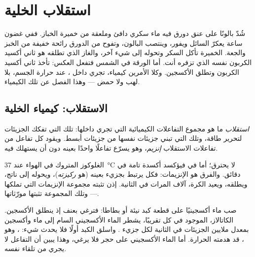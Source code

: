 \chapter{استقلاب الخلية}\label{ch:g10:cell-metabolism}

شُدّ بالونًا على عنق دورق فيه ماء سكري دافئ وملعقة من خميرة الخباز.
ففي غضون ساعة يعكرّ السائل ويفور، وينتصب البالون، وتفوح من الدورق
رائحة خفيفة من الخبز والجعة.  الخميرة تأكل السكر وتحوله إلى شيء
آخر، والغاز الذي تطلقه هو ثاني أكسيد الكربون نفسه الذي تزفره أنت. أما
الورقة في الشمس فتفعل العكس: تأخذ ثاني أكسيد الكربون وتطلق الأكسجين.
وكلا الأمرين كيمياء، تجري داخل ، عند حرارة الجسم، بلا لهب ولا
حمض --- وهذا الفصل عن تلك الكيمياء.

\section{الاستقلاب: كيمياء الخلية}

\begin{definition}[الاستقلاب]\label{def:g10:cell-metabolism:metabolism}
\emph{استقلاب}  ما هو مجموع التفاعلات الكيميائية
التي تجري داخلها: تلك التي تفكك الجزيئات لتحرير طاقة، وتلك التي تبني
جزيئات  نفسها من جزيئات أبسط. ويقود كل تفاعل من تفاعلات
الاستقلاب \emph{إنزيم}، وهو  يسرّع تفاعلًا واحدًا
بعينه دون أن يستهلك فيه.
\end{definition}

\begin{proposition}\label{prop:g10:cell-metabolism:enzymes}
الغلوكوز المتروك في الهواء عند \qty{37}{\celsius} لا يحترق؛ أما في
 فيؤكسد أكسدة تامة في دقائق. والفرق هو الإنزيمات: فكل 
يرتبط بجزيء بعينه (هو \emph{ركيزته})، ويحوله إلى ناتج، ويطلقه، ويعيد
الكرة، آلاف المرات في الثانية.   إذن تثبته مجموعة
الإنزيمات التي تملكها --- وتلك المجموعة تثبتها مورّثاتها.
\end{proposition}
\admitted

\begin{example}\label{ex:g10:cell-metabolism:catalase}
صب ماء أكسجينيًا على قطعة كبد نيئة أو بطاطا: فترغي بعنف إذ ينطلق
الأكسجين.  الكاتالاز، الموجود في كل  تقريبًا، يشطر الماء
الأكسجيني السام إلى ماء وأكسجين بمعدل ملايين الجزيئات في الثانية لكل
جزيء . واسلق الكبد أولًا فلا يحدث شيء: ، وهو ، قد
هدمته الحرارة. أما الماء الأكسجيني على حجر فلا يرغي، وهذا يبين أن
التفاعل لا يجري من تلقاء نفسه.
\end{example}

